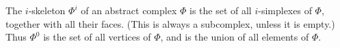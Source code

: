 The $i$-skeleton $\Phi^i$ of an abstract complex $\Phi$ is the set of all $i$-simplexes of $\Phi$, together with all their faces. (This is always a subcomplex, unless it is empty.) Thus $\Phi^0$ is the set of all vertices of $\Phi$, and is the union of all elements of $\Phi$.
